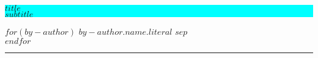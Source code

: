 %
%
%
% 



\colorbox{cyan}{
	\parbox[t]{0.93\textwidth}{ %
		\parbox[t]{0.91\textwidth}{ %
			\raggedright %
			\fontsize{50pt}{80pt}\selectfont %
			\vspace{0.7cm} %
			
			$title$\\
			\fontsize{25pt}{40pt}\selectfont
			$subtitle$\\
			
			\vspace{0.7cm} %
		}
	}
}

\vfill %


\parbox[t]{0.93\textwidth}{ %
	\raggedleft %
	\large %
$for(by-author)$%
{\Large $by-author.name.literal$}%
$sep$\\ %
$endfor$%
	
	\hfill\rule{0.2\linewidth}{1pt}%
}
